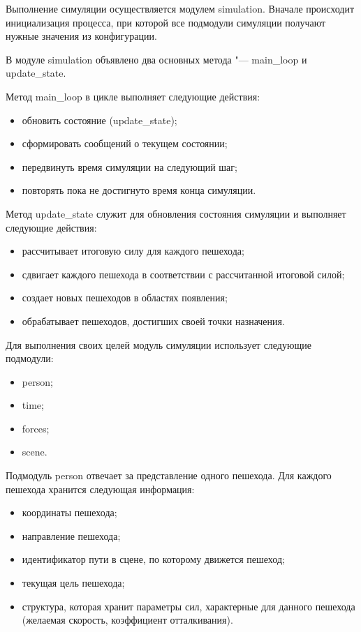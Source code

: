 Выполнение симуляции осуществляется модулем si\-mu\-la\-ti\-on.
Вначале происходит инициализация процесса, при которой все подмодули симуляции получают нужные значения из конфигурации.

В модуле simulation объявлено два основных метода "--- main\_loop и update\_state.

Метод main\_loop в цикле выполняет следующие действия:
\begin{itemize}
  \item обновить состояние (update\_state);
  \item сформировать сообщений о текущем состоянии;
  \item передвинуть время симуляции на следующий шаг;
  \item повторять пока не достигнуто время конца симуляции.
\end{itemize}

Метод update\_state служит для обновления состояния симуляции и выполняет следующие действия:
\begin{itemize}
  \item рассчитывает итоговую силу для каждого пешехода;
  \item сдвигает каждого пешехода в соответствии с рассчитанной итоговой силой;
  \item создает новых пешеходов в областях появления;
  \item обрабатывает пешеходов, достигших своей точки назначения.
\end{itemize}

Для выполнения своих целей модуль симуляции использует следующие подмодули:
\begin{itemize}
  \item person;
  \item time;
  \item forces;
  \item scene.
\end{itemize}

Подмодуль person отвечает за представление одного пешехода.
Для каждого пешехода хранится следующая информация:
\begin{itemize}
  \item координаты пешехода;
  \item направление пешехода;
  \item идентификатор пути в сцене, по которому движется пешеход;
  \item текущая цель пешехода;
  \item структура, которая хранит параметры сил, характерные для данного пешехода (желаемая скорость, коэффициент отталкивания).
\end{itemize}

